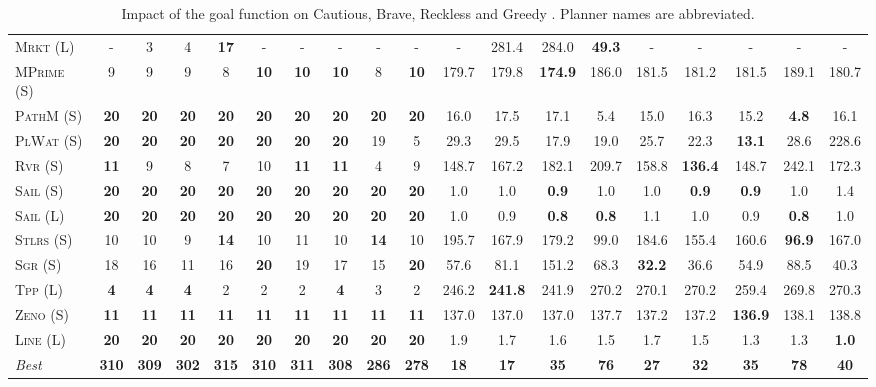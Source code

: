 \documentclass[11pt,landscape]{article}
\begin{document}
\begin{table}[tb]
{\begin{tabular}{|l||ccccccccc||ccccccccc||}
\textsc{Mrkt} (L)&-&3&4&\textbf{17}&-&-&-&-&-&-&281.4&284.0&\textbf{49.3}&-&-&-&-&-\\
\textsc{MPrime} (S)&9&9&9&8&\textbf{10}&\textbf{10}&\textbf{10}&8&\textbf{10}&179.7&179.8&\textbf{174.9}&186.0&181.5&181.2&181.5&189.1&180.7\\
\textsc{PathM} (S)&\textbf{20}&\textbf{20}&\textbf{20}&\textbf{20}&\textbf{20}&\textbf{20}&\textbf{20}&\textbf{20}&\textbf{20}&16.0&17.5&17.1&5.4&15.0&16.3&15.2&\textbf{4.8}&16.1\\
\textsc{PlWat} (S)&\textbf{20}&\textbf{20}&\textbf{20}&\textbf{20}&\textbf{20}&\textbf{20}&\textbf{20}&19&5&29.3&29.5&17.9&19.0&25.7&22.3&\textbf{13.1}&28.6&228.6\\
\textsc{Rvr} (S)&\textbf{11}&9&8&7&10&\textbf{11}&\textbf{11}&4&9&148.7&167.2&182.1&209.7&158.8&\textbf{136.4}&148.7&242.1&172.3\\
\textsc{Sail} (S)&\textbf{20}&\textbf{20}&\textbf{20}&\textbf{20}&\textbf{20}&\textbf{20}&\textbf{20}&\textbf{20}&\textbf{20}&1.0&1.0&\textbf{0.9}&1.0&1.0&\textbf{0.9}&\textbf{0.9}&1.0&1.4\\
\textsc{Sail} (L)&\textbf{20}&\textbf{20}&\textbf{20}&\textbf{20}&\textbf{20}&\textbf{20}&\textbf{20}&\textbf{20}&\textbf{20}&1.0&0.9&\textbf{0.8}&\textbf{0.8}&1.1&1.0&0.9&\textbf{0.8}&1.0\\
\textsc{Stlrs} (S)&10&10&9&\textbf{14}&10&11&10&\textbf{14}&10&195.7&167.9&179.2&99.0&184.6&155.4&160.6&\textbf{96.9}&167.0\\
\textsc{Sgr} (S)&18&16&11&16&\textbf{20}&19&17&15&\textbf{20}&57.6&81.1&151.2&68.3&\textbf{32.2}&36.6&54.9&88.5&40.3\\
\textsc{Tpp} (L)&\textbf{4}&\textbf{4}&\textbf{4}&2&2&2&\textbf{4}&3&2&246.2&\textbf{241.8}&241.9&270.2&270.1&270.2&259.4&269.8&270.3\\
\textsc{Zeno} (S)&\textbf{11}&\textbf{11}&\textbf{11}&\textbf{11}&\textbf{11}&\textbf{11}&\textbf{11}&\textbf{11}&\textbf{11}&137.0&137.0&137.0&137.7&137.2&137.2&\textbf{136.9}&138.1&138.8\\
\textsc{Line} (L)&\textbf{20}&\textbf{20}&\textbf{20}&\textbf{20}&\textbf{20}&\textbf{20}&\textbf{20}&\textbf{20}&\textbf{20}&1.9&1.7&1.6&1.5&1.7&1.5&1.3&1.3&\textbf{1.0}
\\\hline
\textit{Best}&\textbf{310}&\textbf{309}&\textbf{302}&\textbf{315}&\textbf{310}&\textbf{311}&\textbf{308}&\textbf{286}&\textbf{278}&\textbf{18}&\textbf{17}&\textbf{35}&\textbf{76}&\textbf{27}&\textbf{32}&\textbf{35}&\textbf{78}&\textbf{40}\\\hline

        \end{tabular}}
        \caption{Impact of the goal function on Cautious, Brave, Reckless and Greedy \pattyd. Planner names are abbreviated.}
        \label{tab:abl-gf}
        \end{table}
        
\end{document}
